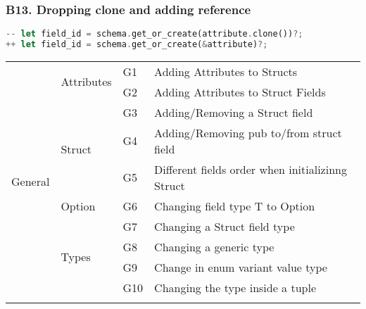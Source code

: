 \documentclass{article}
\begin{document}
\subsubsection{B13. Dropping clone and adding reference}

\begin{lstlisting}[language=Rust, style=colouredRust, label={l3}]
-- let field_id = schema.get_or_create(attribute.clone())?;
++ let field_id = schema.get_or_create(&attribute)?;
\end{lstlisting}

\begin{table}[]

\hskip-2.5cm\begin{tabular}{|l|l|l|l|}
\hline

\multirow{12}{*}{General}        
& \multirow{2}{*}{Attributes}    & G1  & Adding Attributes to Structs                                        \\
                                 &                                & G2  & Adding Attributes to Struct Fields                                  \\\cline{2-3}
                                 & \multirow{3}{*}{Struct}        & G3  & Adding/Removing a Struct field                                      \\
                                 &                                & G4  & Adding/Removing pub to/from struct field                            \\
                                 &                                & G5  & Different fields order when initializinng Struct                       \\\cline{2-3}
                                 & Option                         & G6  & Changing field type T to Option                                          \\\cline{2-3}
                                 & \multirow{4}{*}{Types}         & G7  & Changing a Struct field type                                        \\
                                 &                                & G8  & Changing a generic type                                             \\
                                 &                                & G9  & Change in enum variant value type                                   \\
                                 &                                & G10 & Changing the type inside a tuple                                         \\\cline{2-3}

\end{tabular}
\end{table}
\end{document}
